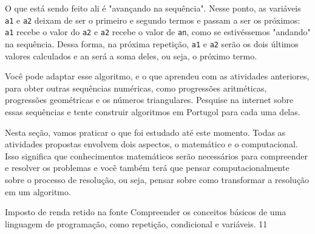 O que está sendo feito ali é "avançando na sequência". Nesse ponto, as variáveis \verb|a1| e \verb|a2| deixam de ser o primeiro e segundo termos e passam a ser os próximos: \verb|a1| recebe o valor do \verb|a2| e \verb|a2| recebe o valor de \verb|an|, como se estivéssemos "andando"{} na sequência. Dessa forma, na próxima repetição, \verb|a1| e \verb|a2| serão os dois últimos valores calculados e an será a soma deles, ou seja, o próximo termo.

Você pode adaptar esse algoritmo, e o que aprendeu com as atividades anteriores, para obter outras sequências numéricas, como progressões aritméticas, progressões geométricas e os números triangulares. Pesquise na internet sobre essas sequências e tente construir algoritmos em Portugol para cada uma delas.

\practice{}
\label{comp-prac1}

Nesta seção, vamos praticar o que foi estudado até este momento. Todas as atividades propostas envolvem dois aspectos, o matemático e o computacional. Isso significa que conhecimentos matemáticos serão necessários para compreender e resolver os problemas e você também terá que pensar computacionalmente sobre o processo de resolução, ou seja, pensar sobre como transformar a resolução em um algoritmo.

\marginpar{\vspace{-1em}}
\begin{objectives}{Imposto de renda retido na fonte}
{
Compreender os conceitos básicos de uma linguagem de programação, como repetição, condicional e variáveis.
}{1}{1}
\end{objectives}

